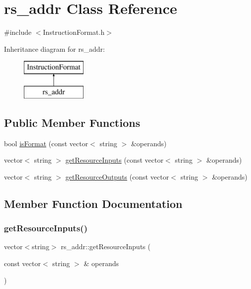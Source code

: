 \hypertarget{classrs__addr}{}\section{rs\+\_\+addr Class Reference}
\label{classrs__addr}


{\ttfamily \#include $<$Instruction\+Format.\+h$>$}

Inheritance diagram for rs\+\_\+addr\+:\begin{figure}[H]
\begin{center}
\leavevmode
\includegraphics[height=2.000000cm]{classrs__addr}
\end{center}
\end{figure}
\subsection*{Public Member Functions}
\begin{DoxyCompactItemize}
\item 
bool \hyperlink{classrs__addr_a49101844a8143d3ad6be1fc1435bc719}{is\+Format} (const vector$<$ string $>$ \&operands)
\item 
vector$<$ string $>$ \hyperlink{classrs__addr_aa0bfc19d335d4888e8fc97edb0ef248e}{get\+Resource\+Inputs} (const vector$<$ string $>$ \&operands)
\item 
vector$<$ string $>$ \hyperlink{classrs__addr_ae38e946613927e43fc9ec274386978f7}{get\+Resource\+Outputs} (const vector$<$ string $>$ \&operands)
\end{DoxyCompactItemize}


\subsection{Member Function Documentation}
\mbox{\label{classrs__addr_aa0bfc19d335d4888e8fc97edb0ef248e}} 
\subsubsection{\texorpdfstring{get\+Resource\+Inputs()}{getResourceInputs()}}
{\footnotesize\ttfamily vector$<$string$>$ rs\+\_\+addr\+::get\+Resource\+Inputs (\begin{DoxyParamCaption}\item[{const vector$<$ string $>$ \&}]{operands }\end{DoxyParamCaption})\hspace{0.3cm}{\ttfamily [virtual]}}

